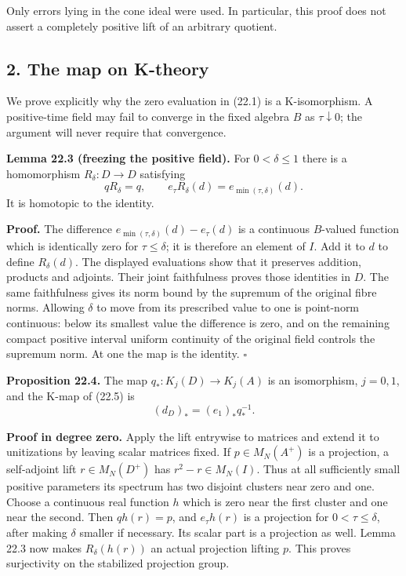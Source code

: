 \documentclass[
  11pt,
]{article}
\begin{document}
Only errors lying in the cone ideal were used. In particular, this proof
does not assert a completely positive lift of an arbitrary quotient.

\subsection{2. The map on K-theory}\label{the-map-on-k-theory}

We prove explicitly why the zero evaluation in (22.1) is a
K-isomorphism. A positive-time field may fail to converge in the fixed
algebra \(B\) as \(\tau\downarrow0\); the argument will never require
that convergence.

\textbf{Lemma 22.3 (freezing the positive field).} For \(0<\delta\leq1\)
there is a homomorphism \(R_\delta:D\to D\) satisfying \[
qR_\delta=q,\qquad
e_\tau R_\delta(d)=e_{\min(\tau,\delta)}(d).
\tag{22.7}
\] It is homotopic to the identity.

\textbf{Proof.} The difference \(e_{\min(\tau,\delta)}(d)-e_\tau(d)\) is
a continuous \(B\)-valued function which is identically zero for
\(\tau\leq\delta\); it is therefore an element of \(I\). Add it to \(d\)
to define \(R_\delta(d)\). The displayed evaluations show that it
preserves addition, products and adjoints. Their joint faithfulness
proves those identities in \(D\). The same faithfulness gives its norm
bound by the supremum of the original fibre norms. Allowing \(\delta\)
to move from its prescribed value to one is point-norm continuous: below
its smallest value the difference is zero, and on the remaining compact
positive interval uniform continuity of the original field controls the
supremum norm. At one the map is the identity. \(\square\)

\textbf{Proposition 22.4.} The map \(q_*:K_j(D)\to K_j(A)\) is an
isomorphism, \(j=0,1\), and the K-map of (22.5) is \[
(d_D)_*=(e_1)_*q_*^{-1}.
\tag{22.8}
\]

\textbf{Proof in degree zero.} Apply the lift entrywise to matrices and
extend it to unitizations by leaving scalar matrices fixed. If
\(p\in M_N(A^+)\) is a projection, a self-adjoint lift \(r\in M_N(D^+)\)
has \(r^2-r\in M_N(I)\). Thus at all sufficiently small positive
parameters its spectrum has two disjoint clusters near zero and one.
Choose a continuous real function \(h\) which is zero near the first
cluster and one near the second. Then \(qh(r)=p\), and \(e_\tau h(r)\)
is a projection for \(0<\tau\leq\delta\), after making \(\delta\)
smaller if necessary. Its scalar part is a projection as well. Lemma
22.3 now makes \(R_\delta(h(r))\) an actual projection lifting \(p\).
This proves surjectivity on the stabilized projection group.
\end{document}
